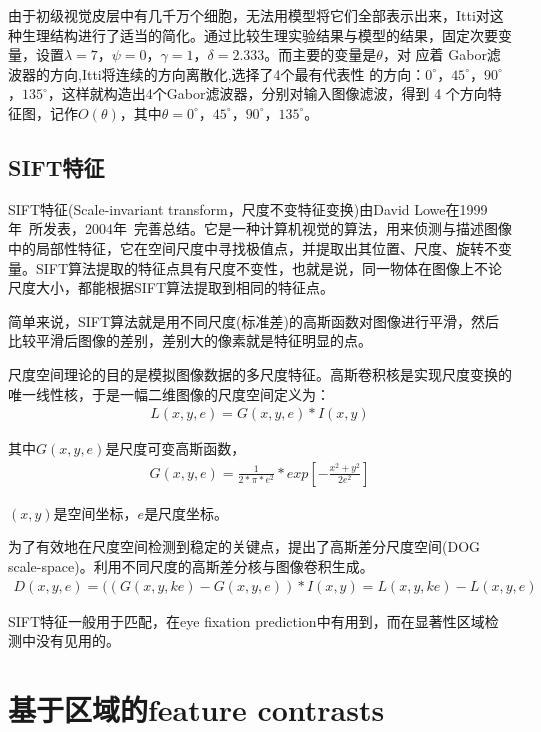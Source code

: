 \documentclass[12pt]{article}
\begin{document}
由于初级视觉皮层中有几千万个细胞，无法用模型将它们全部表示出来，Itti对这种生理结构进行了适当的简化。通过比较生理实验结果与模型的结果，固定次要变量，设置$ λ = 7$，$\psi= 0$，$\gamma = 1$，$\delta = 2.333$。而主要的变量是$\theta$，对 应着 Gabor滤波器的方向,Itti将连续的方向离散化,选择了4个最有代表性 的方向：$0^{\circ}$，$45^{\circ}$，$90^{\circ}$，$135^{\circ}$，这样就构造出4个Gabor滤波器，分别对输入图像滤波，得到 4 个方向特征图，记作$O(\theta)$，其中$\theta=0^{\circ}$，$45^{\circ}$，$90^{\circ}$，$135^{\circ}$。

\subsection{SIFT特征}

SIFT特征(Scale-invariant transform，尺度不变特征变换)由David Lowe在1999年~\cite{lowe1999object}所发表，2004年~\cite{lowe2004distinctive}完善总结。它是一种计算机视觉的算法，用来侦测与描述图像中的局部性特征，它在空间尺度中寻找极值点，并提取出其位置、尺度、旋转不变量。SIFT算法提取的特征点具有尺度不变性，也就是说，同一物体在图像上不论尺度大小，都能根据SIFT算法提取到相同的特征点。

简单来说，SIFT算法就是用不同尺度(标准差)的高斯函数对图像进行平滑，然后比较平滑后图像的差别，差别大的像素就是特征明显的点。

尺度空间理论的目的是模拟图像数据的多尺度特征。高斯卷积核是实现尺度变换的唯一线性核，于是一幅二维图像的尺度空间定义为：
\begin{align}
L(x, y, e) = G(x, y, e) * I(x, y)
\end{align}

其中$G(x, y, e)$是尺度可变高斯函数，
\begin{align}
 G(x,y,e) = \frac{1}{2*\pi *e^2} * exp[-\frac{x^2 + y^2}{2e^2}]
\end{align}

$(x, y)$是空间坐标，$e$是尺度坐标。

为了有效地在尺度空间检测到稳定的关键点，提出了高斯差分尺度空间(DOG scale-space)。利用不同尺度的高斯差分核与图像卷积生成。
\begin{align}
D(x,y,e) = ((G(x,y,ke) - G(x,y,e)) * I(x,y) = L(x,y,ke) - L(x,y,e)
\end{align}

SIFT特征一般用于匹配，在eye fixation prediction中有用到，而在显著性区域检测中没有见用的。

\section{基于区域的feature contrasts}
\end{document}
